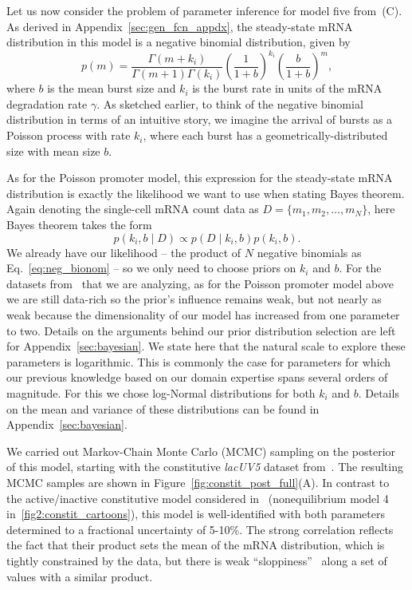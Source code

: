 Let us now consider the problem of parameter inference for model five
from~(C). As derived in
Appendix~\ref{sec:gen_fcn_appdx}, the steady-state mRNA distribution in this
model is a negative binomial distribution, given by
\begin{equation}
p(m) = \frac{\Gamma(m+k_i)}{\Gamma(m+1)\Gamma(k_i)}
        \left(\frac{1}{1+b}\right)^{k_i}
        \left(\frac{b}{1+b}\right)^m,
\label{eq:neg_bionom}
\end{equation}
where $b$ is the mean burst size and $k_i$ is the burst rate in units of the
mRNA degradation rate $\gamma$. As sketched earlier, to think of the negative
binomial distribution in terms of an intuitive story, we imagine the arrival of
bursts as a Poisson process with rate $k_i$, where each burst has a
geometrically-distributed size with mean size $b$.

As for the Poisson promoter model, this expression for the steady-state mRNA
distribution is exactly the likelihood we want to use when stating Bayes
theorem. Again denoting the single-cell mRNA count data as $D=\{m_1, m_2,\dots,
m_N\}$, here Bayes theorem takes the form
\begin{equation}
p(k_i, b \mid D) \propto p(D\mid k_i,b)p(k_i, b).
\end{equation}
We already have our likelihood -- the product of $N$ negative binomials as
Eq.~\ref{eq:neg_bionom} -- so we only need to choose priors on $k_i$ and $b$.
For the datasets from~\cite{Jones2014} that we are analyzing, as for the Poisson
promoter model above we are still data-rich so the prior's influence remains
weak, but not nearly as weak because the dimensionality of our model has
increased from one parameter to two. Details on the arguments behind our prior
distribution selection are left for Appendix~\ref{sec:bayesian}. We state here
that the natural scale to explore these parameters is logarithmic. This is
commonly the case for parameters for which our previous knowledge based on our
domain expertise spans several orders of magnitude. For this we chose log-Normal
distributions for both $k_i$ and $b$. Details on the mean and variance of these
distributions can be found in Appendix~\ref{sec:bayesian}.

We carried out Markov-Chain Monte Carlo (MCMC) sampling on the posterior of this
model, starting with the constitutive \textit{lacUV5} dataset
from~\cite{Jones2014}. The resulting MCMC samples are shown in
Figure~\ref{fig:constit_post_full}(A). In contrast to the active/inactive
constitutive model considered in~\cite{Razo-Mejia2020} (nonequilibrium model 4
in~\ref{fig2:constit_cartoons}), this model is well-identified with both
parameters determined to a fractional uncertainty of 5-10\%. The strong
correlation reflects the fact that their product sets the mean of the mRNA
distribution, which is tightly constrained by the data, but there is weak
``sloppiness''~\cite{Transtrum2015} along a set of values with a similar
product.

